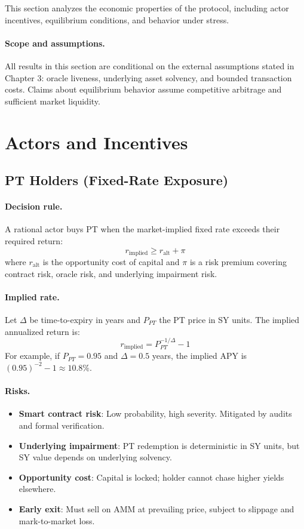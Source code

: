 
This section analyzes the economic properties of the protocol, including actor incentives, equilibrium conditions, and behavior under stress.

\paragraph{Scope and assumptions.} All results in this section are conditional on the external assumptions stated in Chapter 3: oracle liveness, underlying asset solvency, and bounded transaction costs. Claims about equilibrium behavior assume competitive arbitrage and sufficient market liquidity.

\section{Actors and Incentives}

\subsection{PT Holders (Fixed-Rate Exposure)}

\paragraph{Decision rule.}
A rational actor buys PT when the market-implied fixed rate exceeds their required return:
\[
r_{\mathrm{implied}} \geq r_{\mathrm{alt}} + \pi
\]
where $r_{\mathrm{alt}}$ is the opportunity cost of capital and $\pi$ is a risk premium covering contract risk, oracle risk, and underlying impairment risk.

\paragraph{Implied rate.}
Let $\Delta$ be time-to-expiry in years and $P_{PT}$ the PT price in SY units. The implied annualized return is:
\[
r_{\mathrm{implied}} = P_{PT}^{-1/\Delta} - 1
\]
For example, if $P_{PT} = 0.95$ and $\Delta = 0.5$ years, the implied APY is $(0.95)^{-2} - 1 \approx 10.8\%$.

\paragraph{Risks.}
\begin{itemize}
\item \textbf{Smart contract risk}: Low probability, high severity. Mitigated by audits and formal verification.
\item \textbf{Underlying impairment}: PT redemption is deterministic in SY units, but SY value depends on underlying solvency.
\item \textbf{Opportunity cost}: Capital is locked; holder cannot chase higher yields elsewhere.
\item \textbf{Early exit}: Must sell on AMM at prevailing price, subject to slippage and mark-to-market loss.
\end{itemize}

